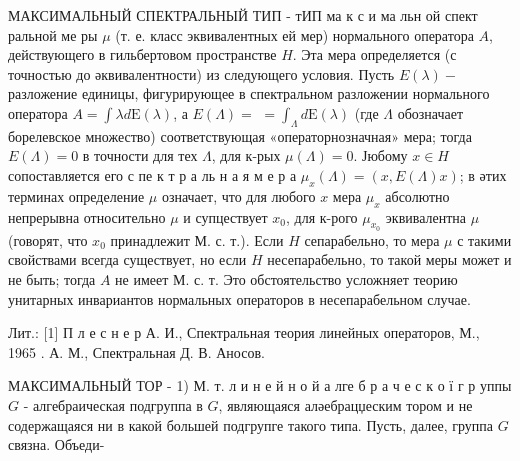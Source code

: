 \documentclass[10pt]{article}
\begin{document}
МАКСИМАЛЬНЫЙ СПЕКТРАЛЬНЫЙ ТИП - тИП ма к с и ма льн ой спект ральной ме ры $\mu$ (т. е. класс эквивалентных ей мер) нормального оператора $A$, действующего в гильбертовом пространстве $H$. Эта мера определяется (с точностью до әквивалентности) из следующего условия. Пусть $E(\lambda)-$ разложение единицы, фигурирующее в спектральном разложении нормального оператора $A=\int \lambda d \mathrm{E}(\lambda)$, а $E(\Lambda)=$ $=\int_{\Lambda} d \mathrm{E}(\lambda)$ (где $\Lambda$ обозначает борелевское множество) соответствующая «операторнозначная» мера; тогда $E(\Lambda)=0$ в точности для тех $\Lambda$, для к-рых $\mu(\Lambda)=0$. Јюбому $x \in H$ сопоставляется его с пе к т р а ль н а я м е р а $\mu_{x}(\Lambda)=(x, E(\Lambda) x)$; в әтих терминах определение $\mu$ означает, что для любого $x$ мера $\mu_{x}$ абсолютно непрерывна относительно $\mu$ и супцествует $x_{0}$, для к-рого $\mu_{x_{0}}$ эквивалентна $\mu$ (говорят, что $x_{0}$ принадлежит М. с. т.). Если $H$ сепарабельно, то мера $\mu$ с такими свойствами всегда существует, но если $H$ несепарабельно, то такой меры может и не быть; тогда $A$ не имеет М. с. т. Это обстоятельство усложняет теорию унитарных инвариантов нормальных операторов в несепарабельном случае.



Лит.: [1] П л е с н е р А. И., Спектральная теория линейных операторов, М., 1965 . А. М., Спектральная Д. В. Аносов.



МАКСИМАЛЬНЫЙ ТОР - 1) М. т. л и н е й н о й а лге б р а ч е с к о ї г р уппы $G$ - алгебраическая подгруппа в $G$, являющаяся аләебрацџеским тором и не содержащаяся ни в какой большей подгрупге такого типа. Пусть, далее, группа $G$ связна. Объеди-
\end{document}
